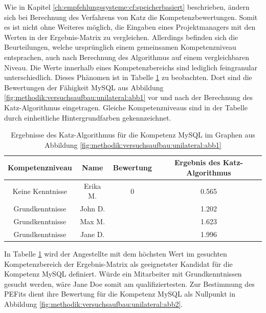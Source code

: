 Wie in Kapitel \ref{ch:empfehlungssysteme:cf:speicherbasiert} beschrieben, ändern sich bei Berechnung des Verfahrens von Katz die Kompetenzbewertungen. Somit es ist nicht ohne Weiteres möglich, die Eingaben eines Projektmanagers mit den Werten in der Ergebnis-Matrix zu vergleichen. Allerdings befinden sich die Beurteilungen, welche ursprünglich einem gemeinsamen Kompetenzniveau entsprachen, auch nach Berechnung des Algorithmus auf einem vergleichbaren Niveau. Die Werte innerhalb eines Kompetenzbereichs sind lediglich feingranular unterschiedlich. Dieses Phänomen ist in Tabelle \ref{tbl:methodik:versuchsaufbau:unilateral:tbl1} zu beobachten. Dort sind die Bewertungen der Fähigkeit MySQL aus Abbildung \ref{fig:methodik:versuchsaufbau:unilateral:abb1} vor und nach der Berechnung des Katz-Algorithmus eingetragen. Gleiche Kompetenzniveaus sind in der Tabelle durch einheitliche Hintergrundfarben gekennzeichnet.

\begin{table}[h]
	\centering
	\begin{tabular}{c|c|c|c}
		Kompetenzniveau & Name & Bewertung & Ergebnis des Katz-Algorithmus \\
		\hline
		\rowcolor{exxetagray} Keine Kenntnisse & Erika M.  & 0                  & 0.565\\
		\hline
		\rowcolor{itemcolor} Grundkenntnisse  & John D.   & \kantengewicht     & 1.202\\
		\rowcolor{itemcolor} Grundkenntnisse  & Max M.    & \kantengewicht     & 1.623\\
		\rowcolor{itemcolor} Grundkenntnisse  & Jane D.   & \kantengewicht     & 1.996
	\end{tabular}
	\caption{Ergebnisse des Katz-Algorithmus für die Kompetenz MySQL im Graphen aus Abbildung \ref{fig:methodik:versuchsaufbau:unilateral:abb1}}
	\label{tbl:methodik:versuchsaufbau:unilateral:tbl1}
\end{table}

In Tabelle \ref{tbl:methodik:versuchsaufbau:unilateral:tbl1} wird der Angestellte mit dem höchsten Wert im gesuchten Kompetenzbereich der Ergebnis-Matrix als geeignetster Kandidat für die Kompetenz MySQL definiert. Würde ein Mitarbeiter mit Grundkenntnissen gesucht werden, wäre Jane Doe somit am qualifiziertesten. Zur Bestimmung des \acp{PEFit} dient ihre Bewertung für die Kompetenz MySQL als Nullpunkt in Abbildung \ref{fig:methodik:versuchsaufbau:unilateral:abb2}.

